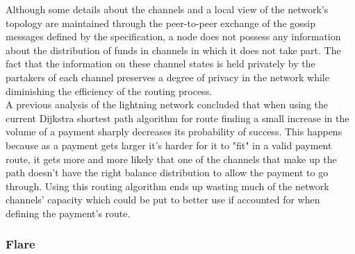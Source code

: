 Although some details about the channels and a local view of the network's topology are maintained through the peer-to-peer exchange of the gossip messages defined by the specification, a node does not possess any information about the distribution of funds in channels in which it does not take part. The fact that the information on these channel states is held privately by the partakers of each channel preserves a degree of privacy in the network while diminishing the efficiency of the routing process. \\
A previous analysis of the lightning network \cite{ln_analysis} concluded that when using the current Dijkstra shortest path algorithm for route finding a small increase in the volume of a payment sharply decreases its probability of success. This happens because as a payment gets larger it's harder for it to "fit" in a valid payment route, it gets more and more likely that one of the channels that make up the path doesn't have the right balance distribution to allow the payment to go through. Using this routing algorithm ends up wasting much of the network channels' capacity which could be put to better use if accounted for when defining the payment's route.

\subsubsection{Flare}
\label{sssec:flare}

